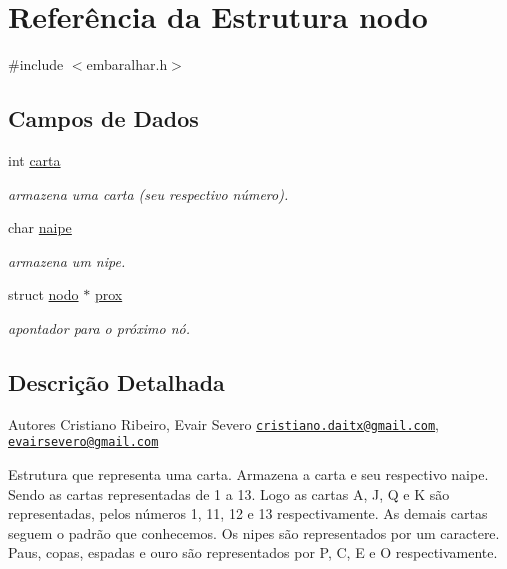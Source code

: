 \hypertarget{structnodo}{
\section{Referência da Estrutura nodo}
\label{structnodo}
}


{\ttfamily \#include $<$embaralhar.h$>$}

\subsection*{Campos de Dados}
\begin{DoxyCompactItemize}
\item 
int \hyperlink{structnodo_a0d153279003388933e082f40da4a3702}{carta}
\begin{DoxyCompactList}\small\item\em armazena uma carta (seu respectivo número). \item\end{DoxyCompactList}\item 
char \hyperlink{structnodo_aba763958bee1abb2961d0d2e82f8cdfb}{naipe}
\begin{DoxyCompactList}\small\item\em armazena um nipe. \item\end{DoxyCompactList}\item 
struct \hyperlink{structnodo}{nodo} $\ast$ \hyperlink{structnodo_a486ad5c9b955ff42eaf8fbf3330e4c75}{prox}
\begin{DoxyCompactList}\small\item\em apontador para o próximo nó. \item\end{DoxyCompactList}\end{DoxyCompactItemize}


\subsection{Descrição Detalhada}
\begin{DoxyAuthor}{Autores}
Cristiano Ribeiro, Evair Severo \href{mailto:cristiano.daitx@gmail.com}{\tt cristiano.daitx@gmail.com}, \href{mailto:evairsevero@gmail.com}{\tt evairsevero@gmail.com}
\end{DoxyAuthor}
Estrutura que representa uma carta. Armazena a carta e seu respectivo naipe. Sendo as cartas representadas de 1 a 13. Logo as cartas A, J, Q e K são representadas, pelos números 1, 11, 12 e 13 respectivamente. As demais cartas seguem o padrão que conhecemos. Os nipes são representados por um caractere. Paus, copas, espadas e ouro são representados por P, C, E e O respectivamente. 

